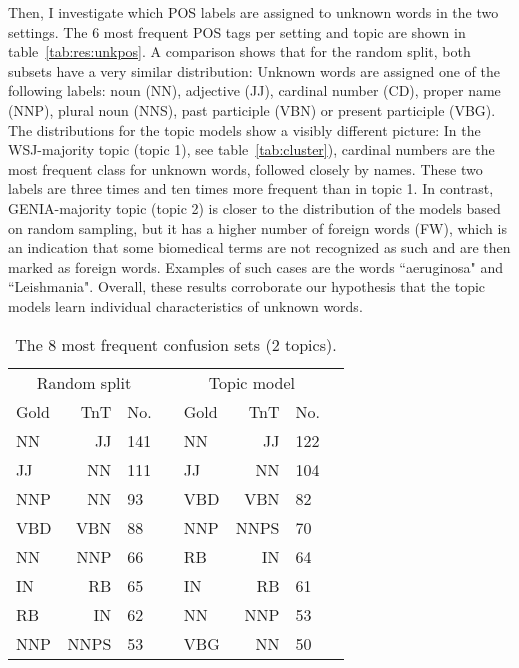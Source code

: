 Then, I investigate which POS labels are assigned to unknown words in the two settings. The 6 most frequent POS tags per setting and topic are shown in table~\ref{tab:res:unkpos}. A comparison shows that for the random split, both subsets have a very similar distribution: Unknown words are assigned one of the following labels: noun (NN), adjective (JJ), cardinal number (CD), proper name (NNP),  plural noun (NNS), past participle (VBN) or present  participle (VBG). The distributions for the topic models show a visibly different picture: In the %
WSJ-majority topic (topic 1), see table~\ref{tab:cluster}), cardinal numbers are the most frequent class for unknown words, followed closely by names. These two labels are three times and ten times more frequent than in topic 1.  In contrast, GENIA-majority topic (topic 2) is closer to the distribution of the models based on random sampling, but it has a higher number of foreign words (FW), which is an indication that some biomedical terms are not recognized as such and are then marked as foreign words. Examples of such cases  are the words ``aeruginosa" and ``Leishmania". Overall, these results  corroborate our hypothesis that the topic models learn individual characteristics of unknown words.

\begin{table}[t]
	\begin{center}
		\begin{tabular}{lrlr|lrlr}
			\multicolumn{3}{c}{Random split} &&  \multicolumn{3}{|c}{Topic model}\\
			Gold & TnT & No. & &  Gold & TnT & No. \\
			\hline
			NN &      JJ &	141   & & NN  & JJ & 122\\
			JJ &       NN & 111   & & JJ  & NN & 104\\
			NNP &      NN & 93         & & VBD & VBN & 82\\
			VBD &      VBN & 88   & & NNP & NNPS & 70\\
			NN &       NNP & 66        & & RB  & IN & 64\\
			IN &       RB & 65         & & IN  & RB & 61\\
			RB    &  IN & 62           & & NN  & NNP & 53\\
			NNP &      NNPS & 53       & & VBG & NN & 50\\
			\hline 
		\end{tabular}
	\end{center}
	\caption{The 8 most frequent confusion sets (2 topics).\label{tab:res:confus}}
\end{table}


